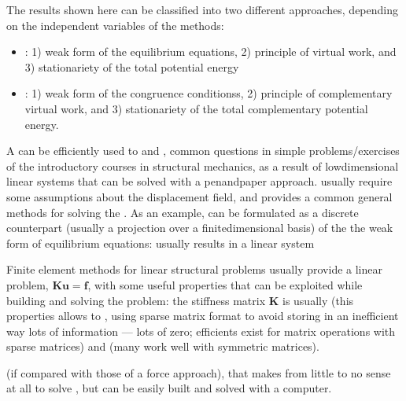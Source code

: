 \documentclass[letterpaper,10pt,english]{jupyterBook}
\begin{document}
\sphinxAtStartPar
{} The results shown here can be classified into two different approaches, depending on the independent variables of the methods:
\begin{itemize}
\item {} 
\sphinxAtStartPar
{}: 1) weak form of the equilibrium equations, 2) principle of virtual work, and 3) stationariety of the total potential energy

\item {} 
\sphinxAtStartPar
{}: 1) weak form of the congruence conditionss, 2) principle of complementary virtual work, and 3) stationariety of the total complementary potential energy.

\end{itemize}

\sphinxAtStartPar
A  can be efficiently used to  and , common questions in simple problems/exercises of the introductory courses in structural mechanics, as a result of low\sphinxhyphen{}dimensional linear systems that can be solved with a pen\sphinxhyphen{}and\sphinxhyphen{}paper approach.  usually require some assumptions about the displacement field, and provides a common general methods for solving the . As an example,  can be formulated as a discrete counterpart (usually a projection over a finite\sphinxhyphen{}dimensional basis) of the the weak form of equilibrium equations:  usually results in a  linear system%
\begin{footnote}[1]\sphinxAtStartFootnote
Finite element methods for linear structural problems usually provide a linear problem, \(\mathbf{K} \mathbf{u} = \mathbf{f}\), with some useful properties that can be exploited while building and solving the problem: the stiffness matrix \(\mathbf{K}\) is usually  (this properties allows to , using sparse matrix format to avoid storing in an inefficient way lots of information — lots of zero; efficients  exist for matrix operations with sparse matrices) and  (many  work well with symmetric matrices).
%
\end{footnote} (if compared with those of a force approach), that makes from little to no sense at all to solve , but can be easily built and solved with a computer.
\end{document}
